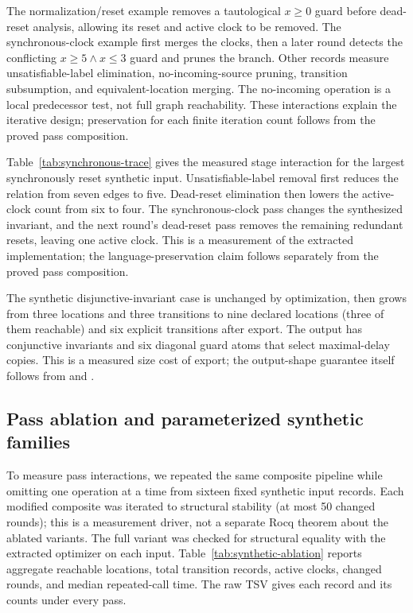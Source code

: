 The normalization/reset example removes a tautological $x\geq0$ guard before
dead-reset analysis, allowing its reset and active clock to be removed. The
synchronous-clock example first merges the clocks, then a later round detects
the conflicting $x\geq5\land x\leq3$ guard and prunes the branch. Other
records measure unsatisfiable-label elimination, no-incoming-source pruning,
transition subsumption, and equivalent-location merging. The no-incoming
operation is a local predecessor test, not full graph reachability. These
interactions explain the iterative design; preservation for each finite
iteration count follows from the proved pass composition.


Table~\ref{tab:synchronous-trace} gives the measured stage interaction for
the largest synchronously reset synthetic input. Unsatisfiable-label removal
first reduces the relation from seven edges to five. Dead-reset elimination
then lowers the active-clock count from six to four. The synchronous-clock
pass changes the synthesized invariant, and the next round's dead-reset pass
removes the remaining redundant resets, leaving one active clock. This is a
measurement of the extracted implementation; the language-preservation
claim follows separately from the proved pass composition.


The synthetic disjunctive-invariant case is unchanged by optimization, then
grows from three locations and three transitions to nine declared locations
(three of them reachable) and six explicit transitions after export. The output has conjunctive invariants and
six diagonal guard atoms that select maximal-delay copies. This is a
measured size cost of export; the output-shape guarantee itself follows from
 and
.

\subsection{Pass ablation and parameterized synthetic families}
To measure pass interactions, we repeated the same composite pipeline while
omitting one operation at a time from sixteen fixed synthetic input records. Each
modified composite was iterated to structural stability (at most 50 changed
rounds); this is a measurement driver, not a separate Rocq theorem about the
ablated variants. The full variant was checked for structural equality with
the extracted optimizer on each input. Table~\ref{tab:synthetic-ablation}
reports aggregate reachable locations, total transition records, active
clocks, changed rounds, and median repeated-call time. The raw TSV gives each
record and its counts under every pass.

